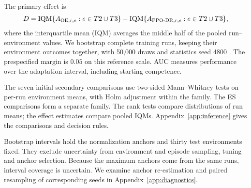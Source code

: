 The primary effect is
\begin{equation}
 D=\operatorname{IQM}\{A_{\mathrm{OE},r,e}:e\in T2\cup T3\}
 -\operatorname{IQM}\{A_{\mathrm{PPO\text{-}DR},r,e}:e\in T2\cup T3\},
\end{equation}
where the interquartile mean (IQM) averages the middle half of the pooled run--environment values. We bootstrap complete training runs, keeping their environment outcomes together, with 50,000 draws and statistics seed 4800 \citep{agarwal2021deep,henderson2018deep}. The prespecified margin is $0.05$ on this reference scale. AUC measures performance over the adaptation interval, including starting competence.

The seven initial secondary comparisons use two-sided Mann--Whitney tests on per-run environment means, with Holm adjustment within the family. The ES comparisons form a separate family. The rank tests compare distributions of run means; the effect estimates compare pooled IQMs. Appendix~\ref{app:inference} gives the comparisons and decision rules.

Bootstrap intervals hold the normalization anchors and thirty test environments fixed. They exclude uncertainty from environment and episode sampling, tuning and anchor selection. Because the maximum anchors come from the same runs, interval coverage is uncertain. We examine anchor re-estimation and paired resampling of corresponding seeds in Appendix~\ref{app:diagnostics}.
